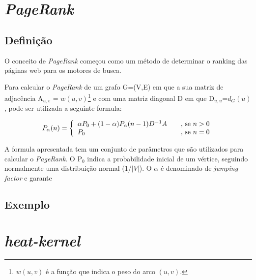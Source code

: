 \documentclass[a4paper,10pt]{article}
\begin{document}
\section*{\textit{PageRank}}

  \subsection*{Definição}

  O conceito de \textit{PageRank} começou como um método de determinar o ranking das páginas web para os motores de busca. 
  
  Para calcular o \textit{PageRank} de um grafo G=(V,E) em que a sua matriz de adjacência A$_{u,v}$ = $w(u,v)$\footnote{$w(u,v)$ é a função que indica o peso do arco $(u,v)$.} e com uma matriz diagonal D em que D$_{u,u}$=$d_G(u)$, pode ser utilizada a seguinte formula:
  
\[ P_\alpha(n) = \left\{
  \begin{array}{l l}
    \alpha P_0+(1-\alpha)P_\alpha(n-1)D^{{-}1}A & \quad \text{, se } n>0   \\
    P_0 & \quad \text{, se }n=0 
  \end{array} \right.\]
  
  A formula apresentada tem um conjunto de parâmetros que são utilizados para calcular o \textit{PageRank}. O P$_0$ indica a probabilidade inicial de um vértice, seguindo normalmente uma distribuição normal (1/$|V|$). O $\alpha$ é denominado de \textit{jumping factor} e garante 
  
  \subsection*{Exemplo}
  
\section*{\textit{heat-kernel}}
\end{document}

